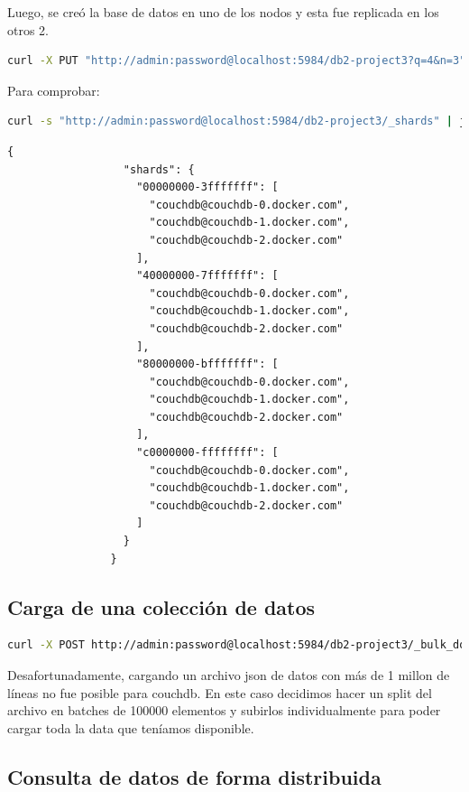 \documentclass{article}
\begin{document}
		Luego, se creó la base de datos en uno de los nodos y esta fue replicada en los otros 2.
		\begin{lstlisting}[language = bash, gobble = 28]
				curl -X PUT "http://admin:password@localhost:5984/db2-project3?q=4&n=3"
		\end{lstlisting}
		Para comprobar:
		\begin{lstlisting}[language = bash, gobble = 28]
				curl -s "http://admin:password@localhost:5984/db2-project3/_shards" | jq .
		\end{lstlisting}
		\begin{lstlisting}[gobble = 28]
				{
				  "shards": {
					"00000000-3fffffff": [
					  "couchdb@couchdb-0.docker.com",
					  "couchdb@couchdb-1.docker.com",
					  "couchdb@couchdb-2.docker.com"
					],
					"40000000-7fffffff": [
					  "couchdb@couchdb-0.docker.com",
					  "couchdb@couchdb-1.docker.com",
					  "couchdb@couchdb-2.docker.com"
					],
					"80000000-bfffffff": [
					  "couchdb@couchdb-0.docker.com",
					  "couchdb@couchdb-1.docker.com",
					  "couchdb@couchdb-2.docker.com"
					],
					"c0000000-ffffffff": [
					  "couchdb@couchdb-0.docker.com",
					  "couchdb@couchdb-1.docker.com",
					  "couchdb@couchdb-2.docker.com"
					]
				  }
				}
		\end{lstlisting}
		
        \subsection{Carga de una colección de datos}
		\begin{lstlisting}[language = bash, gobble = 28]
				curl -X POST http://admin:password@localhost:5984/db2-project3/_bulk_docs -d @data.json -H "Content-Type:application/json"
		\end{lstlisting}
		Desafortunadamente, cargando un archivo json de datos con más de 1 millon de líneas no fue posible para couchdb. En este caso decidimos hacer un split del archivo en batches de 100000 elementos y subirlos individualmente para poder cargar toda la data que teníamos disponible.

        \subsection{Consulta de datos de forma distribuida}
\end{document}
